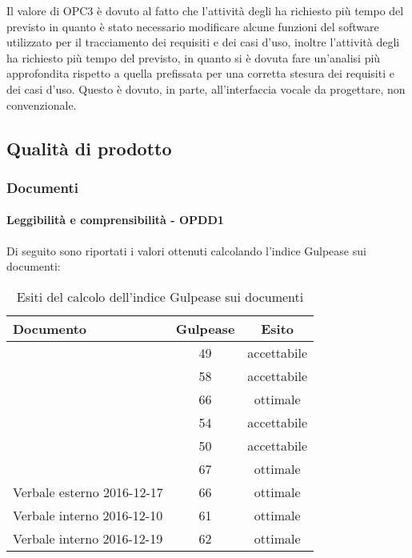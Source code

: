 \documentclass[PdQ.tex]{subfiles}
\begin{document}
			Il valore di OPC3 è dovuto al fatto che l’attività degli \AMMP{} ha richiesto più tempo del previsto in quanto è stato necessario modificare alcune funzioni del software utilizzato per il tracciamento dei requisiti e dei casi
d’uso, inoltre l’attività degli \ANP{} ha richiesto più tempo del previsto, in quanto si è dovuta fare un’analisi più approfondita rispetto a quella prefissata per una corretta stesura dei requisiti e dei casi d’uso. Questo è dovuto, in parte, all’interfaccia vocale da progettare, non convenzionale.
		
\newpage		
\subsection{Qualità di prodotto}
	\subsubsection{Documenti}
		\paragraph{Leggibilità e comprensibilità - OPDD1}
				Di seguito sono riportati i valori ottenuti calcolando l'indice Gulpease sui documenti:
				\begin{table}[h]
				\centering
				\begin{tabular}{l c c}
					\hline
					\rule[-0.3cm]{0cm}{0.8cm}
					\textbf{Documento} & \textbf{Gulpease} & \textbf{Esito} \\
					\hline
					\rule[0cm]{0cm}{0.4cm}
					\PPdocRR & 49 & accettabile \\
					\rule[0cm]{0cm}{0.4cm}
					\NPdocRR & 58 & accettabile \\ 
					\rule[0cm]{0cm}{0.4cm}
					\ARdocRR & 66 & ottimale \\ 
					\rule[0cm]{0cm}{0.4cm}
					\PQdocRR & 54 & accettabile \\ 
					\rule[0cm]{0cm}{0.4cm}
					\Gldoc & 50 & accettabile\\ 
					\rule[0cm]{0cm}{0.4cm}
					\SDKdoc & 67 & ottimale \\ 
					\rule[0cm]{0cm}{0.4cm}
					Verbale esterno 2016-12-17 & 66 & ottimale\\ 
					\rule[0cm]{0cm}{0.4cm}
					Verbale interno 2016-12-10 & 61 & ottimale\\ 
					\rule[0cm]{0cm}{0.4cm}
					Verbale interno 2016-12-19 & 62 & ottimale\\ 
					
					\hline
				\end{tabular}
				\caption{Esiti del calcolo dell'indice Gulpease sui documenti}
			\end{table}		
\end{document}
